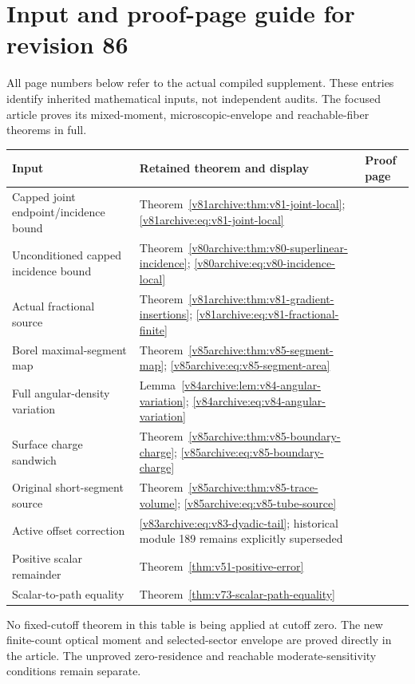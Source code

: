 \clearpage
\section*{Input and proof-page guide for revision 86}
\label{v86:dependency-guide}
All page numbers below refer to the actual compiled supplement. These
entries identify inherited mathematical inputs, not independent audits.
The focused article proves its mixed-moment, microscopic-envelope and
reachable-fiber theorems in full.

\begin{center}\small
\begin{tabular}{p{}p{}p{}}
\hline
Input & Retained theorem and display & Proof page\\
\hline
Capped joint endpoint/incidence bound &
Theorem~\ref{v81archive:thm:v81-joint-local};
\eqref{v81archive:eq:v81-joint-local} &
\pageref{v81archive:thm:v81-joint-local}\\[6pt]
Unconditioned capped incidence bound &
Theorem~\ref{v80archive:thm:v80-superlinear-incidence};
\eqref{v80archive:eq:v80-incidence-local} &
\pageref{v80archive:thm:v80-superlinear-incidence}\\[6pt]
Actual fractional source &
Theorem~\ref{v81archive:thm:v81-gradient-insertions};
\eqref{v81archive:eq:v81-fractional-finite} &
\pageref{v81archive:thm:v81-gradient-insertions}\\[6pt]
Borel maximal-segment map &
Theorem~\ref{v85archive:thm:v85-segment-map};
\eqref{v85archive:eq:v85-segment-area} &
\pageref{v85archive:thm:v85-segment-map}\\[6pt]
Full angular-density variation &
Lemma~\ref{v84archive:lem:v84-angular-variation};
\eqref{v84archive:eq:v84-angular-variation} &
\pageref{v84archive:lem:v84-angular-variation}\\[6pt]
Surface charge sandwich &
Theorem~\ref{v85archive:thm:v85-boundary-charge};
\eqref{v85archive:eq:v85-boundary-charge} &
\pageref{v85archive:thm:v85-boundary-charge}\\[6pt]
Original short-segment source &
Theorem~\ref{v85archive:thm:v85-trace-volume};
\eqref{v85archive:eq:v85-tube-source} &
\pageref{v85archive:thm:v85-trace-volume}\\[6pt]
Active offset correction &
\eqref{v83archive:eq:v83-dyadic-tail}; historical module 189 remains
explicitly superseded &
\pageref{v83archive:eq:v83-dyadic-tail}\\[6pt]
Positive scalar remainder &
Theorem~\ref{thm:v51-positive-error} &
\pageref{thm:v51-positive-error}\\[6pt]
Scalar-to-path equality &
Theorem~\ref{thm:v73-scalar-path-equality} &
\pageref{thm:v73-scalar-path-equality}\\
\hline
\end{tabular}
\end{center}
No fixed-cutoff theorem in this table is being applied at cutoff zero.
The new finite-count optical moment and selected-sector envelope are
proved directly in the article. The unproved zero-residence and
reachable moderate-sensitivity conditions remain separate.
\clearpage
